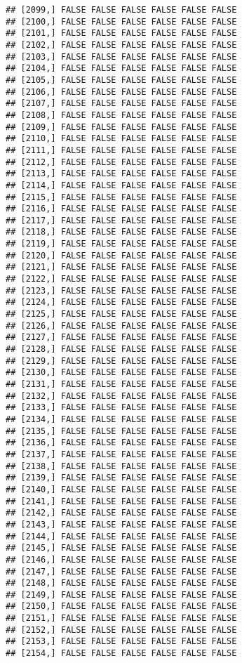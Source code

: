 \documentclass[
]{article}
\begin{document}
\begin{verbatim}
## [2099,] FALSE FALSE FALSE FALSE FALSE FALSE
## [2100,] FALSE FALSE FALSE FALSE FALSE FALSE
## [2101,] FALSE FALSE FALSE FALSE FALSE FALSE
## [2102,] FALSE FALSE FALSE FALSE FALSE FALSE
## [2103,] FALSE FALSE FALSE FALSE FALSE FALSE
## [2104,] FALSE FALSE FALSE FALSE FALSE FALSE
## [2105,] FALSE FALSE FALSE FALSE FALSE FALSE
## [2106,] FALSE FALSE FALSE FALSE FALSE FALSE
## [2107,] FALSE FALSE FALSE FALSE FALSE FALSE
## [2108,] FALSE FALSE FALSE FALSE FALSE FALSE
## [2109,] FALSE FALSE FALSE FALSE FALSE FALSE
## [2110,] FALSE FALSE FALSE FALSE FALSE FALSE
## [2111,] FALSE FALSE FALSE FALSE FALSE FALSE
## [2112,] FALSE FALSE FALSE FALSE FALSE FALSE
## [2113,] FALSE FALSE FALSE FALSE FALSE FALSE
## [2114,] FALSE FALSE FALSE FALSE FALSE FALSE
## [2115,] FALSE FALSE FALSE FALSE FALSE FALSE
## [2116,] FALSE FALSE FALSE FALSE FALSE FALSE
## [2117,] FALSE FALSE FALSE FALSE FALSE FALSE
## [2118,] FALSE FALSE FALSE FALSE FALSE FALSE
## [2119,] FALSE FALSE FALSE FALSE FALSE FALSE
## [2120,] FALSE FALSE FALSE FALSE FALSE FALSE
## [2121,] FALSE FALSE FALSE FALSE FALSE FALSE
## [2122,] FALSE FALSE FALSE FALSE FALSE FALSE
## [2123,] FALSE FALSE FALSE FALSE FALSE FALSE
## [2124,] FALSE FALSE FALSE FALSE FALSE FALSE
## [2125,] FALSE FALSE FALSE FALSE FALSE FALSE
## [2126,] FALSE FALSE FALSE FALSE FALSE FALSE
## [2127,] FALSE FALSE FALSE FALSE FALSE FALSE
## [2128,] FALSE FALSE FALSE FALSE FALSE FALSE
## [2129,] FALSE FALSE FALSE FALSE FALSE FALSE
## [2130,] FALSE FALSE FALSE FALSE FALSE FALSE
## [2131,] FALSE FALSE FALSE FALSE FALSE FALSE
## [2132,] FALSE FALSE FALSE FALSE FALSE FALSE
## [2133,] FALSE FALSE FALSE FALSE FALSE FALSE
## [2134,] FALSE FALSE FALSE FALSE FALSE FALSE
## [2135,] FALSE FALSE FALSE FALSE FALSE FALSE
## [2136,] FALSE FALSE FALSE FALSE FALSE FALSE
## [2137,] FALSE FALSE FALSE FALSE FALSE FALSE
## [2138,] FALSE FALSE FALSE FALSE FALSE FALSE
## [2139,] FALSE FALSE FALSE FALSE FALSE FALSE
## [2140,] FALSE FALSE FALSE FALSE FALSE FALSE
## [2141,] FALSE FALSE FALSE FALSE FALSE FALSE
## [2142,] FALSE FALSE FALSE FALSE FALSE FALSE
## [2143,] FALSE FALSE FALSE FALSE FALSE FALSE
## [2144,] FALSE FALSE FALSE FALSE FALSE FALSE
## [2145,] FALSE FALSE FALSE FALSE FALSE FALSE
## [2146,] FALSE FALSE FALSE FALSE FALSE FALSE
## [2147,] FALSE FALSE FALSE FALSE FALSE FALSE
## [2148,] FALSE FALSE FALSE FALSE FALSE FALSE
## [2149,] FALSE FALSE FALSE FALSE FALSE FALSE
## [2150,] FALSE FALSE FALSE FALSE FALSE FALSE
## [2151,] FALSE FALSE FALSE FALSE FALSE FALSE
## [2152,] FALSE FALSE FALSE FALSE FALSE FALSE
## [2153,] FALSE FALSE FALSE FALSE FALSE FALSE
## [2154,] FALSE FALSE FALSE FALSE FALSE FALSE

\end{verbatim}
\end{document}
